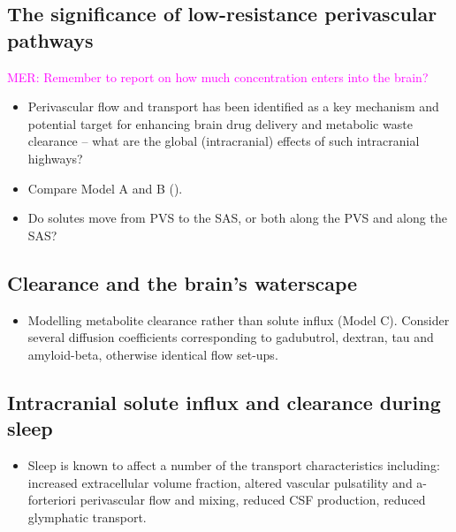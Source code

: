 \documentclass[fleqn,10pt]{wlscirep}
\newcommand{\mer}[1]{\textcolor{magenta}{#1}}
\newcommand{\draft}[1]{\textcolor{gray}{#1}}
\begin{document}
\draft{\lipsum[1]}

\subsection*{The significance of low-resistance perivascular pathways}

\mer{MER: Remember to report on how much concentration enters into the brain?}

\begin{itemize}
\item
  Perivascular flow and transport has been identified as a key
  mechanism and potential target for enhancing brain drug delivery and
  metabolic waste clearance -- what are the global (intracranial)
  effects of such intracranial highways? 
\item
  Compare Model A and B ().
\item
  Do solutes move from PVS to the SAS, or both along the PVS and along the SAS?
\end{itemize}

\draft{\lipsum[1]}

\subsection*{Clearance and the brain's waterscape}

\draft{\lipsum[1]}

\begin{itemize}
\item 
  Modelling metabolite clearance rather than solute influx (Model
  C). Consider several diffusion coefficients corresponding to
  gadubutrol, dextran, tau and amyloid-beta, otherwise identical flow
  set-ups.
\end{itemize}

\subsection*{Intracranial solute influx and clearance during sleep}

\begin{itemize}
\item
  Sleep is known to affect a number of the transport characteristics including: increased extracellular volume fraction, altered vascular pulsatility and a-forteriori perivascular flow and mixing, reduced CSF production, reduced glymphatic transport.
\end{itemize}
\end{document}

